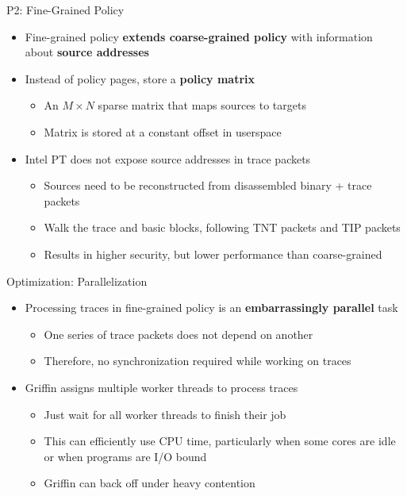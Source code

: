\documentclass[12pt, dvipsnames, aspectratio=169]{beamer}
\begin{document}
\begin{frame}[c]{P2: Fine-Grained Policy}{}
  \begin{itemize}
    \item Fine-grained policy {\bf extends coarse-grained policy} with information\\about {\bf source addresses}

    \vfill
    \item Instead of policy pages, store a {\bf policy matrix}
    \begin{itemize}
      \item An $M \times N$ sparse matrix that maps sources to targets
      \item Matrix is stored at a constant offset in userspace
    \end{itemize}

    \vfill
    \item Intel PT does not expose source addresses in trace packets
    \begin{itemize}
      \item Sources need to be reconstructed from disassembled binary + trace packets
      \item Walk the trace and basic blocks, following TNT packets and TIP packets
      \item Results in higher security, but lower performance than coarse-grained
    \end{itemize}
  \end{itemize}
\end{frame}

\begin{frame}[c]{Optimization: Parallelization}{}
  \begin{itemize}
    \item Processing traces in fine-grained policy is an {\bf embarrassingly parallel} task
    \begin{itemize}
      \item One series of trace packets does not depend on another
      \item Therefore, no synchronization required while working on traces
    \end{itemize}

    \vfill
    \item Griffin assigns multiple worker threads to process traces
    \begin{itemize}
      \item Just wait for all worker threads to finish their job
      \item This can efficiently use CPU time, particularly when some cores are idle\\or when programs are I/O bound
      \item Griffin can back off under heavy contention
    \end{itemize}
  \end{itemize}
\end{frame}
\end{document}
